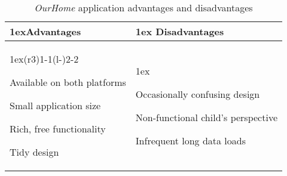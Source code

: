 \begin{table}[htb]
\begin{tabularx}{\linewidth}{>{\parskip1ex}X@{\kern4\tabcolsep}>{\parskip1ex}X}
\toprule
\hfil\bfseries Advantages
&
\hfil\bfseries Disadvantages
\\
\cmidrule(r{3\tabcolsep}){1-1}\cmidrule(l{-\tabcolsep}){2-2}

Available on both platforms\par
Small application size\par
Rich, free functionality\par
Tidy design\par

&

\par
Occasionally confusing design\par
Non-functional child's perspective\par
Infrequent long data loads

\\
\bottomrule
\end{tabularx}
\caption{\textit{OurHome} application advantages and disadvantages}
\label{tab:applications:ourhome}
\end{table}